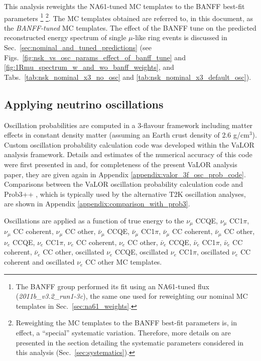 This analysis reweights the NA61-tuned MC templates to the BANFF best-fit parameters
\footnote{
  The BANFF group performed its fit using an NA61-tuned flux ({\em 2011b\_v3.2\_run1-3c}),
  the same one used for reweighting our nominal MC templates in Sec.\ \ref{sec:na61_weights}.
}
\footnote{
  Reweighting the MC templates to the BANFF best-fit parameters is, in effect, a ``special''
  systematic variation. Therefore, more details on 
  are presented in the section detailing the systematic parameters considered in this analysis
  (Sec.\ \ref{sec:systematics}).
}.
The MC templates obtained are referred to, in this document, as the {\em BANFF-tuned} MC templates.
The effect of the BANFF tune on the predicted reconstructed energy spectrum of
single $\mu$-like ring events is discussed in Sec.\ \ref{sec:nominal_and_tuned_predictions} (see 
Figs.\ \ref{fig:nsk_vs_osc_params_effect_of_banff_tune} and \ref{fig:1Rmu_spectrum_w_and_wo_banff_weights}, and
Tabs.\ \ref{tab:nsk_nominal_x3_no_osc} and \ref{tab:nsk_nominal_x3_default_osc}).


\subsection{Applying neutrino oscillations}
\label{sec:applying_oscillations}

Oscillation probabilities are computed in a 3-flavour framework including matter effects in constant density matter
(assuming an Earth crust density of 2.6 g/cm$^{3}$).
Custom oscillation probability calculation code was developed within the VaLOR analysis framework.
Details and estimates of the numerical accuracy of this code were first presented in \cite{OurRun12DisappAnalysis3Flavour} 
and, for completeness of the present VaLOR analysis paper, they are given again 
in Appendix \ref{appendix:valor_3f_osc_prob_code}.
Comparisons between the VaLOR oscillation probability calculation code and Prob3++ \cite{Prob3}, 
which is typically used by the alternative T2K oscillation analyses, are shown in Appendix \ref{appendix:comparison_with_prob3}.

Oscillations are applied as a function of true energy to the 
  $\nu_{\mu}$ CCQE,
  $\nu_{\mu}$ CC1$\pi$, 
  $\nu_{\mu}$ CC coherent, 
  $\nu_{\mu}$ CC other, 
  $\bar{\nu}_{\mu}$ CCQE, 
  $\bar{\nu}_{\mu}$ CC1$\pi$, 
  $\bar{\nu}_{\mu}$ CC coherent, 
  $\bar{\nu}_{\mu}$ CC other, 
  $\nu_{e}$ CCQE, 
  $\nu_{e}$ CC1$\pi$,
  $\nu_{e}$ CC coherent,
  $\nu_{e}$ CC other,
  $\bar{\nu}_{e}$ CCQE, 
  $\bar{\nu}_{e}$ CC1$\pi$,
  $\bar{\nu}_{e}$ CC coherent,
  $\bar{\nu}_{e}$ CC other,
  oscillated $\nu_{e}$ CCQE, 
  oscillated $\nu_{e}$ CC1$\pi$,
  oscillated $\nu_{e}$ CC coherent and
  oscillated $\nu_{e}$ CC other
MC templates.

